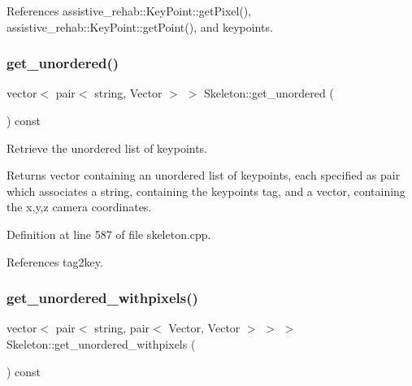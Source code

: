 References assistive\+\_\+rehab\+::\+Key\+Point\+::get\+Pixel(), assistive\+\_\+rehab\+::\+Key\+Point\+::get\+Point(), and keypoints.

\mbox{\label{classassistive__rehab_1_1Skeleton_a7b9f01b2b0f5450920335347c5861a2f}} 
\subsubsection{\texorpdfstring{get\_unordered()}{get\_unordered()}}
{\footnotesize\ttfamily vector$<$ pair$<$ string, Vector $>$ $>$ Skeleton\+::get\+\_\+unordered (\begin{DoxyParamCaption}{ }\end{DoxyParamCaption}) const\hspace{0.3cm}{\ttfamily [virtual]}}



Retrieve the unordered list of keypoints. 

\begin{DoxyReturn}{Returns}
vector containing an unordered list of keypoints, each specified as pair which associates a string, containing the keypoint\textquotesingle{}s tag, and a vector, containing the x,y,z camera coordinates. 
\end{DoxyReturn}


Definition at line 587 of file skeleton.\+cpp.


\begin{DoxyCode}{0}

\end{DoxyCode}


References tag2key.

\mbox{\label{classassistive__rehab_1_1Skeleton_a513a3dc56d55a7b10b256378ae63c6c7}} 
\subsubsection{\texorpdfstring{get\_unordered\_withpixels()}{get\_unordered\_withpixels()}}
{\footnotesize\ttfamily vector$<$ pair$<$ string, pair$<$ Vector, Vector $>$ $>$ $>$ Skeleton\+::get\+\_\+unordered\+\_\+withpixels (\begin{DoxyParamCaption}{ }\end{DoxyParamCaption}) const\hspace{0.3cm}{\ttfamily [virtual]}}



